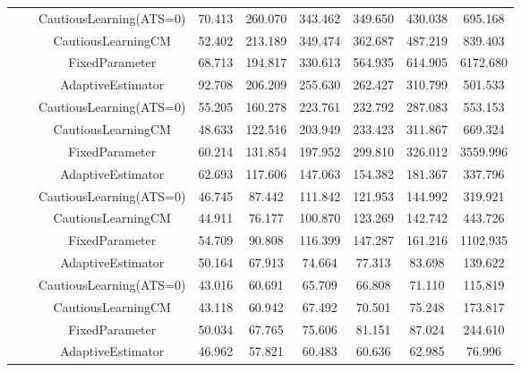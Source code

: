 \begin{table}[!h]
\begin{tabular}[t]{ccccccccc}
 &  & CautiousLearning(ATS=0) & 70.413 & 260.070 & 343.462 & 349.650 & 430.038 & 695.168\\

 &  & CautiousLearningCM & 52.402 & 213.189 & 349.474 & 362.687 & 487.219 & 839.403\\

 & \multirow[t]{-4}{*}{\centering\arraybackslash 0.25} & FixedParameter & 68.713 & 194.817 & 330.613 & 564.935 & 614.905 & 6172.680\\
\cmidrule{2-9}
 &  & AdaptiveEstimator & 92.708 & 206.209 & 255.630 & 262.427 & 310.799 & 501.533\\

 &  & CautiousLearning(ATS=0) & 55.205 & 160.278 & 223.761 & 232.792 & 287.083 & 553.153\\

 &  & CautiousLearningCM & 48.633 & 122.516 & 203.949 & 233.423 & 311.867 & 669.324\\

 & \multirow[t]{-4}{*}{\centering\arraybackslash 0.35} & FixedParameter & 60.214 & 131.854 & 197.952 & 299.810 & 326.012 & 3559.996\\
\cmidrule{2-9}
 &  & AdaptiveEstimator & 62.693 & 117.606 & 147.063 & 154.382 & 181.367 & 337.796\\

 &  & CautiousLearning(ATS=0) & 46.745 & 87.442 & 111.842 & 121.953 & 144.992 & 319.921\\

 &  & CautiousLearningCM & 44.911 & 76.177 & 100.870 & 123.269 & 142.742 & 443.726\\

 & \multirow[t]{-4}{*}{\centering\arraybackslash 0.50} & FixedParameter & 54.709 & 90.808 & 116.399 & 147.287 & 161.216 & 1102.935\\
\cmidrule{2-9}
 &  & AdaptiveEstimator & 50.164 & 67.913 & 74.664 & 77.313 & 83.698 & 139.622\\

 &  & CautiousLearning(ATS=0) & 43.016 & 60.691 & 65.709 & 66.808 & 71.110 & 115.819\\

 &  & CautiousLearningCM & 43.118 & 60.942 & 67.492 & 70.501 & 75.248 & 173.817\\

 & \multirow[t]{-4}{*}{\centering\arraybackslash 0.75} & FixedParameter & 50.034 & 67.765 & 75.606 & 81.151 & 87.024 & 244.610\\
\cmidrule{2-9}
 &  & AdaptiveEstimator & 46.962 & 57.821 & 60.483 & 60.636 & 62.985 & 76.996\\


\end{tabular}
\end{table}
